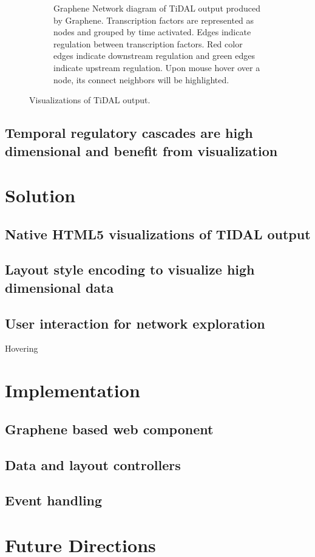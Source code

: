 \begin{figure}
\begin{subfigure}[b]{\textwidth}
    \caption{
      Graphene Network diagram of TiDAL output produced by Graphene.
      Transcription factors are represented as nodes and grouped by time activated.
      Edges indicate regulation between transcription factors.
      Red color edges indicate downstream regulation and green edges indicate upstream regulation.
      Upon  mouse hover over a node, its connect neighbors will be highlighted.
    }
    \label{Figure:tidal-output-graphene}
  \end{subfigure}
  \caption{Visualizations of TiDAL output.}
  \label{Figure:tidal-output}
\end{figure}

\autocite{zaslavsky2013reconstruction}


\subsection{Temporal regulatory cascades are high dimensional and benefit from visualization}


\section{Solution}
\subsection{Native HTML5 visualizations of TIDAL output}
\subsection{Layout style encoding to visualize high dimensional data}
\subsection{User interaction for network exploration}
Hovering

\section{Implementation}
\subsection{Graphene based web component}
\subsection{Data and layout controllers}
\subsection{Event handling}

\section{Future Directions}
